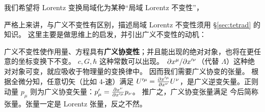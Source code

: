 我们希望将 Lorentz 变换局域化为某种“局域 Lorentz 不变性”，

严格上来讲，与广义不变性有区别，描述局域 Lorentz 不变性须用 \S\ref{sec:tetrad} 的知识。
这里主要是做思维上的启发，并引出广义不变性的动机：


广义不变性使作用量、方程具有\textbf{广义协变性}；并且能出现的绝对对象，也将在更任意的坐标变换下不变。
$c,G,\hbar$ 这种常数可以出现。
$\pdv*{x^\mu}{x'^\nu}$（代替 $\Lambda$）这种绝对对象可变，就应吸收于物理量的变换律中。
因而我们需要广义协变的张量。
根据全微分知，任意切矢（比如 4-速）满足 $U'^\mu=\pdv{x'^\mu}{x^\nu}U^\nu$，是广义逆变矢量。正则动量 $p_\mu$ 则为广义协变矢量：$p'_\mu=\pdv{x^\nu}{x'^\mu} p_\nu$。
推广之，广义协变张量满足
今后简称张量。张量一定是 Lorentz 张量，反之不然。

